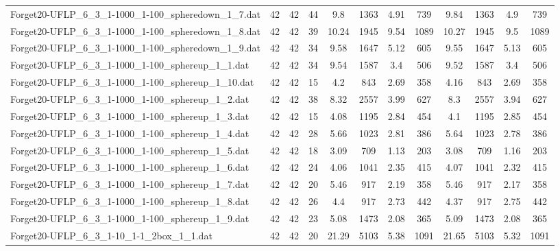 \begin{sidewaystable}[!ht]
{\begin{tabular}{lccccccccccc}
Forget20-UFLP\_6\_3\_1-1000\_1-100\_spheredown\_1\_7.dat & 42 & 42 & 44 & 9.8 & 1363 & 4.91 & 739 & 9.84 & 1363 &  \textcolor{blue2}{4.9} & 739 \\
Forget20-UFLP\_6\_3\_1-1000\_1-100\_spheredown\_1\_8.dat & 42 & 42 & 39 & 10.24 & 1945 & 9.54 & 1089 & 10.27 & 1945 &  \textcolor{blue2}{9.5} & 1089 \\
Forget20-UFLP\_6\_3\_1-1000\_1-100\_spheredown\_1\_9.dat & 42 & 42 & 34 & 9.58 & 1647 &  \textcolor{blue2}{5.12} & 605 & 9.55 & 1647 & 5.13 & 605 \\
Forget20-UFLP\_6\_3\_1-1000\_1-100\_sphereup\_1\_1.dat & 42 & 42 & 34 & 9.54 & 1587 & 3.4 & 506 & 9.52 & 1587 & 3.4 & 506 \\
Forget20-UFLP\_6\_3\_1-1000\_1-100\_sphereup\_1\_10.dat & 42 & 42 & 15 & 4.2 & 843 &  \textcolor{blue2}{2.69} & 358 & 4.16 & 843 &  \textcolor{blue2}{2.69} & 358 \\
Forget20-UFLP\_6\_3\_1-1000\_1-100\_sphereup\_1\_2.dat & 42 & 42 & 38 & 8.32 & 2557 & 3.99 & 627 & 8.3 & 2557 &  \textcolor{blue2}{3.94} & 627 \\
Forget20-UFLP\_6\_3\_1-1000\_1-100\_sphereup\_1\_3.dat & 42 & 42 & 15 & 4.08 & 1195 &  \textcolor{blue2}{2.84} & 454 & 4.1 & 1195 & 2.85 & 454 \\
Forget20-UFLP\_6\_3\_1-1000\_1-100\_sphereup\_1\_4.dat & 42 & 42 & 28 & 5.66 & 1023 & 2.81 & 386 & 5.64 & 1023 &  \textcolor{blue2}{2.78} & 386 \\
Forget20-UFLP\_6\_3\_1-1000\_1-100\_sphereup\_1\_5.dat & 42 & 42 & 18 & 3.09 & 709 &  \textcolor{blue2}{1.13} & 203 & 3.08 & 709 & 1.16 & 203 \\
Forget20-UFLP\_6\_3\_1-1000\_1-100\_sphereup\_1\_6.dat & 42 & 42 & 24 & 4.06 & 1041 & 2.35 & 415 & 4.07 & 1041 &  \textcolor{blue2}{2.32} & 415 \\
Forget20-UFLP\_6\_3\_1-1000\_1-100\_sphereup\_1\_7.dat & 42 & 42 & 20 & 5.46 & 917 & 2.19 & 358 & 5.46 & 917 &  \textcolor{blue2}{2.17} & 358 \\
Forget20-UFLP\_6\_3\_1-1000\_1-100\_sphereup\_1\_8.dat & 42 & 42 & 26 & 4.4 & 917 &  \textcolor{blue2}{2.73} & 442 & 4.37 & 917 & 2.75 & 442 \\
Forget20-UFLP\_6\_3\_1-1000\_1-100\_sphereup\_1\_9.dat & 42 & 42 & 23 & 5.08 & 1473 &  \textcolor{blue2}{2.08} & 365 & 5.09 & 1473 &  \textcolor{blue2}{2.08} & 365 \\
Forget20-UFLP\_6\_3\_1-10\_1-1\_2box\_1\_1.dat & 42 & 42 & 20 & 21.29 & 5103 & 5.38 & 1091 & 21.65 & 5103 &  \textcolor{blue2}{5.32} & 1091 \\

\end{tabular}}
\end{sidewaystable}

